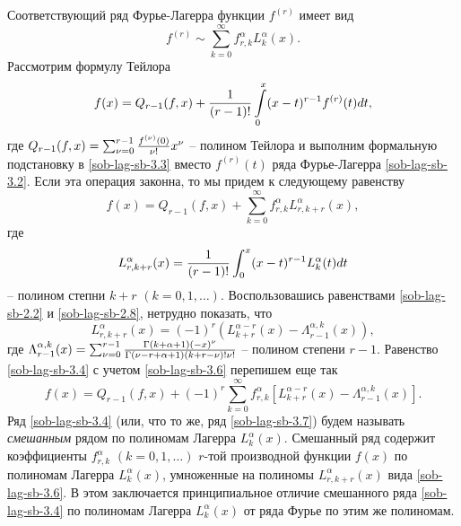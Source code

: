 Соответствующий ряд Фурье-Лагерра функции $f^{(r)}$ имеет вид
     \begin{equation}\label{sob-lag-sb-3.2}
f^{(r)}\sim\sum_{k=0}^\infty f_{r,k}^\alpha
L_k^\alpha(x).
     \end{equation}
Рассмотрим формулу Тейлора
\begin{equation}\label{sob-lag-sb-3.3}
f(x)=Q_{r-1}(f,x)+{1\over (r-1)!}\int\limits_{0}^x(x-t)^{r-1}
     f^{(r)}(t)dt,
     \end{equation}
     где $Q_{r-1}(f,x) =\sum_{\nu=0}^{r-1}{f^{(\nu)}(0)\over\nu!}x^\nu$ --
полином Тейлора и выполним формальную подстановку в \eqref{sob-lag-sb-3.3} вместо
$f^{(r)}(t)$ ряда Фурье-Лагерра \eqref{sob-lag-sb-3.2}. Если эта операция
законна, то мы придем к следующему равенству
  \begin{equation}\label{sob-lag-sb-3.4}
f(x)=Q_{r-1}(f,x)+
\sum_{k=0}^\infty f_{r,k}^\alpha L_{r,k+r}^\alpha(x),
\end{equation}
где
\begin{equation}\label{sob-lag-sb-3.5}
L_{r,k+r}^\alpha(x)={1\over (r-1)!}\int_{0}^x(x-t)^{r-1}L^\alpha_k(t)dt
\end{equation}
-- полином степни $k+r$ $( k=0,1,\ldots)$. Воспользовашись  равенствами  \eqref{sob-lag-sb-2.2} и  \eqref{sob-lag-sb-2.8}, нетрудно показать, что
 \begin{equation}\label{sob-lag-sb-3.6}
L_{r,k+r}^\alpha(x)=(-1)^r(L_{k+r}^{\alpha-r}(x)-\Lambda_{r-1}^{\alpha,k}(x)),
\end{equation}
где
$
\Lambda_{r-1}^{\alpha,k}(x)=     \sum_{\nu=0}^{r-1}
{\Gamma(k+\alpha+1)(-x)^\nu\over\Gamma(\nu-r+\alpha+1)(k+r-\nu)!\nu!}
$
-- полином степени $r-1$. Равенство \eqref{sob-lag-sb-3.4} с учетом \eqref{sob-lag-sb-3.6} перепишем еще так
 \begin{equation}\label{sob-lag-sb-3.7}
  f(x)=Q_{r-1}(f,x)+(-1)^r\sum_{k=0}^\infty f_{r,k}^\alpha
[L_{k+r}^{\alpha-r}(x)-\Lambda_{r-1}^{\alpha,k}(x)].
 \end{equation}
  Ряд  \eqref{sob-lag-sb-3.4} (или, что то же, ряд \eqref{sob-lag-sb-3.7})  будем называть \cite{Haar-Tcheb-Shar13} \textit{смешанным} рядом по полиномам Лагерра
$L_k^\alpha(x)$. Смешанный ряд содержит
     коэффициенты $f_{r,k}^\alpha$ $(k=0,1,\ldots)$ $r$-той производной
     функции $f(x)$ по полиномам Лагерра $L_k^\alpha(x)$, умноженные
     на полиномы  $L_{r,k+r}^{\alpha}(x)$ вида \eqref{sob-lag-sb-3.6}. В этом
     заключается принципиальное отличие смешанного ряда \eqref{sob-lag-sb-3.4}
     по полиномам Лагерра $L_k^\alpha(x)$ от ряда Фурье    по этим же полиномам.
